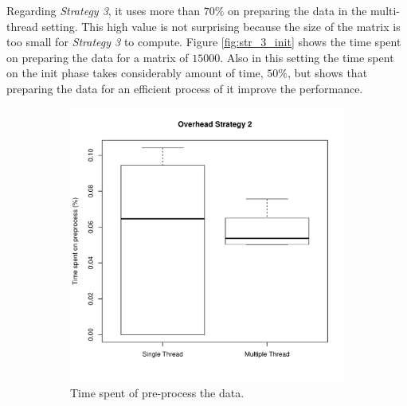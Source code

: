 \documentclass[]{article}
\begin{document}
Regarding \textit{Strategy 3}, it uses more than $70\%$ on preparing the data in the multi-thread setting. This high value is not surprising because the size of the matrix is too small for \textit{Strategy 3} to compute. Figure \ref{fig:str_3_init} shows the time spent on preparing the data for a matrix of $15000$.
Also in this setting the time spent on the init phase takes considerably amount of time, $50\%$, but shows that preparing the data for an efficient process of it improve the performance.

\begin{figure}[H]
    \hspace{-1.7cm}
    \begin{subfigure}{.6\textwidth}
        \includegraphics[width=1\textwidth]{img/init_phase.pdf}
        \caption
        {Time spent of pre-process the data.}
        \label{fig:init}
    \end{subfigure}%
    \begin{subfigure}{.6\textwidth}

\end{subfigure}
\end{figure}
\end{document}
